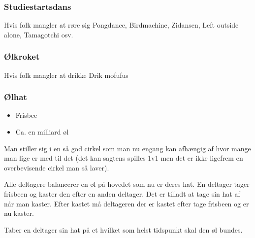 \begin{multicols}{2}
\subsubsection*{Studiestartsdans}{Hvis folk mangler at røre sig}
    Pongdance, Birdmachine, Zidansen, Left outside alone, Tamagotchi osv.
    
\subsubsection*{Ølkroket}{Hvis folk mangler at drikke}
    Drik mofufus \\



\subsubsection*{Ølhat}
\begin{itemize}
    \item Frisbee
    \item Ca. en milliard øl
\end{itemize}

Man stiller sig i en så god cirkel som man nu engang kan afhængig af hvor mange man lige er med til det (det kan sagtens spilles 1v1 men det er ikke ligefrem en overbevisende cirkel man så laver). 

Alle deltagere balancerer en øl på hovedet som nu er deres hat. En deltager tager frisbeen og kaster den efter en anden deltager. Det er tilladt at tage sin hat af når man kaster. Efter kastet må deltageren der er kastet efter tage frisbeen og er nu kaster. 

Taber en deltager sin hat på et hvilket som helst tidspunkt skal den øl bundes.

\end{multicols}